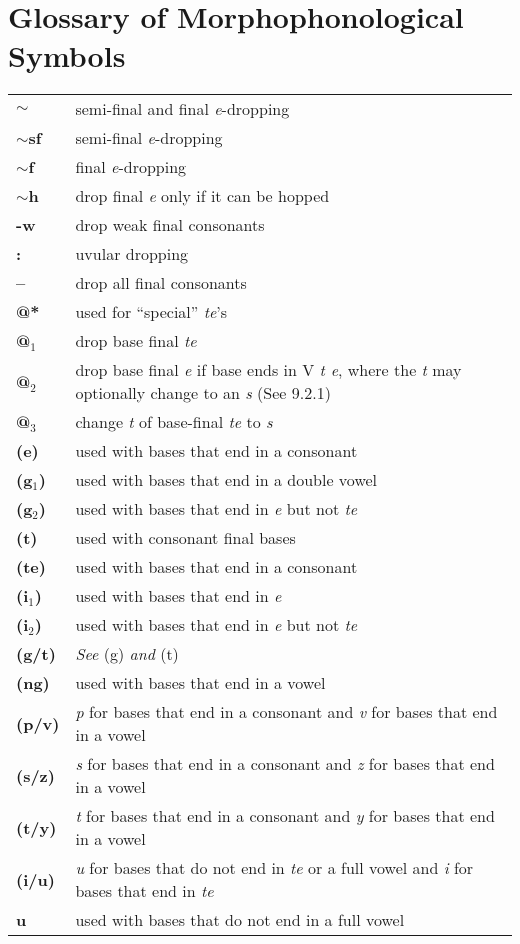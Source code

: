 \documentclass{article}
\begin{document}
\section{Glossary of Morphophonological Symbols}

\begin{tabular}{l l}

\textbf{$\sim$} & semi-final and final \textit{e}-dropping \\
\textbf{$\sim$sf} & semi-final \textit{e}-dropping \\
\textbf{$\sim$f} & final \textit{e}-dropping \\
\textbf{$\sim$h} & drop final \textit{e} only if it can be hopped \\
\textbf{-w} & drop weak final consonants \\
\textbf{:} & uvular dropping \\
\textbf{--} & drop all final consonants \\
\textbf{@*} & used for ``special'' \textit{te}'s \\
\textbf{@$_\text{1}$} & drop base final \textit{te} \\
\textbf{@$_\text{2}$} & drop base final \textit{e} if base ends in V \textit{t e}, where the \textit{t} may optionally change to an \textit{s} (See 9.2.1) \\
\textbf{@$_\text{3}$} & change \textit{t} of base-final \textit{te} to \textit{s} \\ 
\textbf{(e)} & used with bases that end in a consonant \\
\textbf{(g$_\text{1}$)} & used with bases that end in a double vowel \\
\textbf{(g$_\text{2}$)} & used with bases that end in \textit{e} but not \textit{te} \\
\textbf{(t)} & used with consonant final bases \\
\textbf{(te)} & used with bases that end in a consonant \\
\textbf{(i$_\text{1}$)} & used with bases that end in \textit{e} \\
\textbf{(i$_\text{2}$)} & used with bases that end in \textit{e} but not \textit{te} \\
\textbf{(g/t)} & \textit{See} (g) \textit{and} (t) \\
\textbf{(ng)} & used with bases that end in a vowel \\
\textbf{(p/v)} & \textit{p} for bases that end in a consonant and \textit{v} for bases that end in a vowel \\
\textbf{(s/z)} & \textit{s} for bases that end in a consonant and \textit{z} for bases that end in a vowel \\
\textbf{(t/y)} & \textit{t} for bases that end in a consonant and \textit{y} for bases that end in a vowel \\
\textbf{(i/u)} & \textit{u} for bases that do not end in \textit{te} or a full vowel and \textit{i} for bases that end in \textit{te} \\
\textbf{u} & used with bases that do not end in a full vowel \\

\end{tabular}
\end{document}
